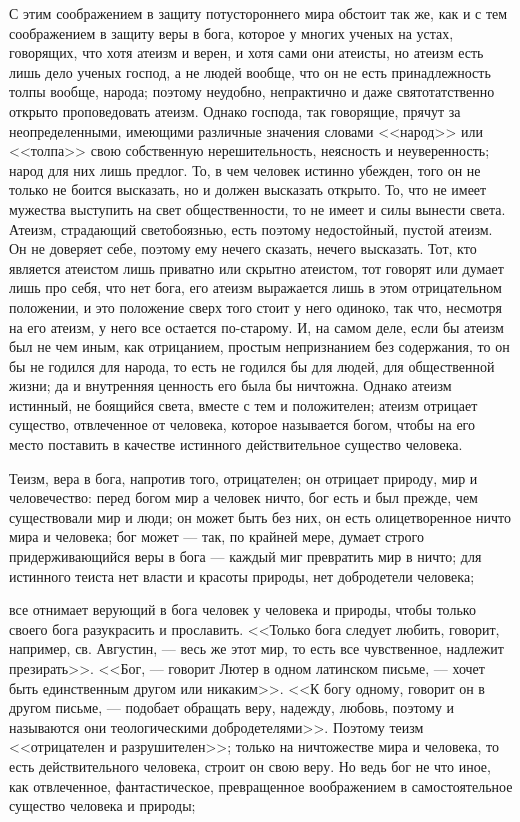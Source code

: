 \documentclass[12pt]{article}
\begin{document}
С этим соображением в защиту потустороннего мира обстоит так же, как и с тем соображением в защиту веры в бога, которое у многих ученых на устах, говорящих, что хотя атеизм и верен, и хотя сами они атеисты, но атеизм есть лишь дело ученых господ, а не людей вообще, что он не есть принадлежность толпы вообще, народа; поэтому неудобно, непрактично и даже святотатственно открыто проповедовать атеизм. Однако господа, так говорящие, прячут за неопределенными, имеющими различные значения словами <<народ>> или <<толпа>> свою собственную нерешительность, неясность и неуверенность; народ для них лишь предлог. То, в чем человек истинно убежден, того он не только не боится высказать, но и должен высказать открыто. То, что не имеет мужества выступить на свет общественности, то не имеет и силы вынести света. Атеизм, страдающий светобоязнью, есть поэтому недостойный, пустой атеизм. Он не доверяет себе, поэтому ему нечего сказать, нечего высказать. Тот, кто является атеистом лишь приватно или скрытно атеистом, тот говорят или думает лишь про себя, что нет бога, его атеизм выражается лишь в этом отрицательном положении, и это положение сверх того стоит у него одиноко, так что, несмотря на его атеизм, у него все остается по-старому. И, на самом деле, если бы атеизм был не чем иным, как отрицанием, простым непризнанием без содержания, то он бы не годился для народа, то есть не годился бы для людей, для общественной жизни; да и внутренняя ценность его была бы ничтожна. Однако атеизм истинный, не боящийся света, вместе с тем и положителен; атеизм отрицает существо, отвлеченное от человека, которое называется богом, чтобы на его место поставить в качестве истинного действительное существо человека. 

Теизм, вера в бога, напротив того, отрицателен; он отрицает природу, мир и человечество: перед богом мир а человек ничто, бог есть и был прежде, чем существовали мир и люди; он может быть без них, он есть олицетворенное ничто мира и человека; бог может --- так, по крайней мере, думает строго придерживающийся веры в бога --- каждый миг превратить мир в ничто; для истинного теиста нет власти и красоты природы, нет добродетели человека; 

все отнимает верующий в бога человек у человека и природы, чтобы только своего бога разукрасить и прославить. <<Только бога следует любить, говорит, например, св. Августин, --- весь же этот мир, то есть все чувственное, надлежит презирать>>. <<Бог, --- говорит Лютер в одном латинском письме, --- хочет быть единственным другом или никаким>>. <<К богу одному, говорит он в другом письме, --- подобает обращать веру, надежду, любовь, поэтому и называются они теологическими добродетелями>>. Поэтому теизм <<отрицателен и разрушителен>>; только на ничтожестве мира и человека, то есть действительного человека, строит он свою веру. Но ведь бог не что иное, как отвлеченное, фантастическое, превращенное воображением в самостоятельное существо человека и природы; 
\end{document}
